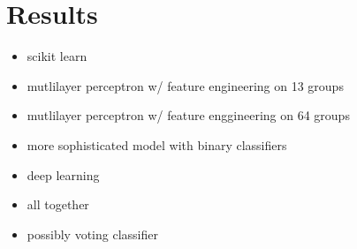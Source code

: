 \chapter{Results}

\begin{itemize}

\item scikit learn
\item mutlilayer perceptron w/ feature engineering on 13 groups
\item mutlilayer perceptron w/ feature enggineering on 64 groups
\item more sophisticated model with binary classifiers
\item deep learning
\item all together
\item possibly voting classifier

\end{itemize}